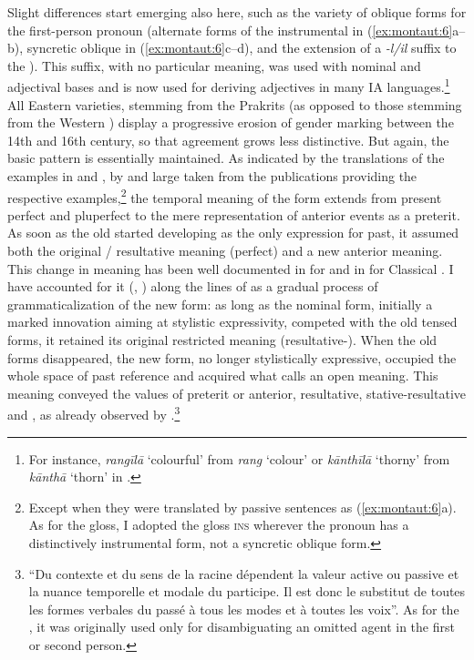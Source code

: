 \documentclass[output=paper]{langsci/langscibook}
\begin{document}
Slight differences start emerging also here, such as the variety of oblique forms for the first-person pronoun (alternate forms of the instrumental in (\ref{ex:montaut:6}a--b), syncretic oblique in (\ref{ex:montaut:6}c--d), and the extension of a \textit{-l/il} suffix to the  ). This suffix, with no particular meaning, was used with nominal and adjectival bases and is now used for deriving adjectives in many IA languages.\footnote{ For instance, \textit{rangīlā} ‘colourful’ from \textit{rang} ‘colour’ or \textit{kānthīlā} ‘thorny’ from \textit{kānthā} ‘thorn’ in .} All Eastern varieties, stemming from the  Prakrits (as opposed to those stemming from the Western ) display a progressive erosion of gender marking between the 14th and 16th century, so that agreement grows less distinctive. But again, the basic pattern is essentially maintained.
As indicated by the translations of the examples in  and , by and large taken from the publications providing the respective examples,\footnote{Except when they were translated by passive sentences as (\ref{ex:montaut:6}a). As for the gloss, I adopted the gloss \textsc{ins} wherever the pronoun has a distinctively instrumental form, not a syncretic oblique form.} the temporal meaning of the form extends from present perfect and pluperfect to the mere representation of anterior events as a preterit. As soon as the old  started developing as the only expression for past, it assumed both the original  / resultative meaning (perfect) and a new anterior meaning. This change in meaning has been well documented in \citet[190]{Peterson1998} for  and in \citet{Breunis1990} for Classical . I have accounted for it (\citealt{Montaut1996}, \citeyear{Montaut2007}) along the lines of \citet{BybeeEtAl1994} as a gradual process of grammaticalization of the new  form: as long as the nominal form, initially a marked innovation aiming at stylistic expressivity, competed with the old tensed forms, it retained its original restricted meaning (resultative-). When the old forms disappeared, the new form, no longer stylistically expressive, occupied the whole space of past reference and acquired what \citet{BybeeEtAl1994} calls an open meaning. This meaning conveyed the values of preterit or anterior, resultative, stative-resultative and , as already observed by \citet[60]{Bloch1906}.\footnote{ “Du contexte et du sens de la racine dépendent la valeur active ou passive et la nuance temporelle et modale du participe. Il est donc le substitut de toutes les formes verbales du passé à tous les modes et à toutes les voix”. As for the , it was originally used only for disambiguating an omitted agent in the first or second person.}
\end{document}
